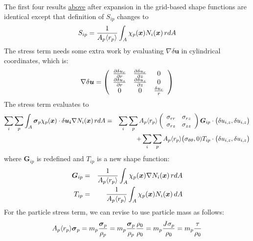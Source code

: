 \documentclass[11pt]{article}
\renewcommand{\vec}[1]{\boldsymbol{#1}}
\newcommand{\tens}[1]{\boldsymbol{\mathsf{#1}}}
\begin{document}
The first four results \hyperref[gridexpand]{above} after expansion in the grid-based shape functions are identical except that definition of $S_{ip}$ changes to
\begin{equation}
     S_{ip} = {1\over A_p\avgrp} \int_A \chi_p(\vec x) N_i(\vec x)\thinspace r dA 
\end{equation}
The stress term needs some extra work by evaluating $\nabla \delta\vec u$ in cylindrical coordinates, which is:
\begin{equation}
    \nabla \delta\vec u =\left( \begin{array}{ccc} {\partial \delta u_r\over \partial r} & {\partial \delta u_r\over \partial z} & 0 \\
                                {\partial \delta u_z\over \partial r} & {\partial \delta u_z\over \partial z} & 0 \\ 0 & 0 & {\delta u_r\over r} \\
                                \end{array}\right)
\end{equation}
The stress term evaluates to
\begin{eqnarray}
   \sum_i\sum_p\int_A \tens\sigma_p \chi_p(\vec x) \cdot \delta\vec{u_i} \nabla N_i(\vec x)\thinspace r dA
   & = &  \sum_i\sum_p A_p\avgrp\left(\begin{array}{cc} \sigma_{rr} & \sigma_{rz} \\ \sigma_{rz} & \sigma_{zz} \end{array}\right) \vec G_{ip} \cdot \bigl(\delta u_{i,z}, \delta u_{i,z}\bigr)
   \nonumber\\
   &&\mbox + \sum_i\sum_p A_p\avgrp\bigl( \sigma_{\theta\theta},0) T_{ip} \cdot \bigl(\delta u_{i,z}, \delta u_{i,z}\bigr)
 \end{eqnarray}
where $\vec G_{ip}$ is redefined and $T_{ip}$ is a new shape function:
\begin{eqnarray}
     \vec G_{ip} & = & {1\over A_p\avgrp} \int_A \chi_p(\vec x) \nabla N_i(\vec x)\thinspace r dA \\
     T_{ip} & = & {1\over A_p\avgrp} \int_A \chi_p(\vec x) N_i(\vec x)\thinspace dA \\
\end{eqnarray}
For the particle stress term, we can revise to use particle mass as follows:
\begin{equation}
     A_p\avgrp\tens\sigma_p = m_p {\tens\sigma_p\over\rho_p} = m_p {\tens\sigma_p\over\rho_p} {\rho_0\over\rho_0} = m_p {J\sigma_p\over\rho_0} = m_p{\tau\over\rho_0}
\end{equation}
\end{document}
